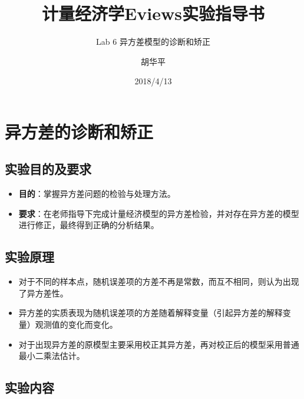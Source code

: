 \documentclass[12pt,(landscape,a4paper),(portrait,a4paper)]{article}
\title{计量经济学Eviews实验指导书}
\subtitle{Lab 6 异方差模型的诊断和矫正}
\author{胡华平}
\date{2018/4/13}
\makeatletter
\def\maxwidth{\ifdim\Gin@nat@width>\linewidth\linewidth\else\Gin@nat@width\fi}
\providecommand{\tightlist}{%
  \setlength{\itemsep}{0pt}\setlength{\parskip}{0pt}}
\let\stdsection\section
\renewcommand\section{\newpage\stdsection}
\makeatother
\begin{document}
\maketitle

\renewcommand{\figurename}{图}
\renewcommand{\contentsname}{目录}
\renewcommand{\tablename}{表}


\makeatletter
\def\maxwidth{ %
  \ifdim\Gin@nat@width>\linewidth
    \linewidth
  \else
    \Gin@nat@width
  \fi
}
\makeatother

{
\setcounter{tocdepth}{5}
\tableofcontents
}
\hypertarget{heteroskedasticity}{%
\section{异方差的诊断和矫正}\label{heteroskedasticity}}

\newpage

\subsection{实验目的及要求}

\begin{itemize}
\tightlist
\item
  \textbf{目的}：掌握异方差问题的检验与处理方法。
\item
  \textbf{要求}：在老师指导下完成计量经济模型的异方差检验，并对存在异方差的模型进行修正，最终得到正确的分析结果。
\end{itemize}

\subsection{实验原理}

\begin{itemize}
\tightlist
\item
  对于不同的样本点，随机误差项的方差不再是常数，而互不相同，则认为出现了异方差性。
\item
  异方差的实质表现为随机误差项的方差随着解释变量（引起异方差的解释变量）观测值的变化而变化。
\item
  对于出现异方差的原模型主要采用校正其异方差，再对校正后的模型采用普通最小二乘法估计。
\end{itemize}

\subsection{实验内容}
\end{document}
